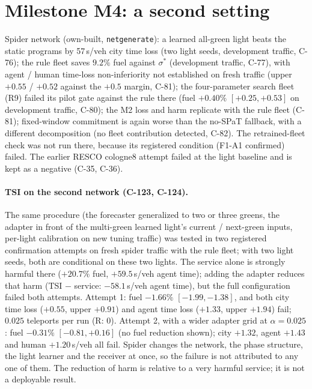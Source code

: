 \documentclass[11pt]{article}
\begin{document}
\section{Milestone M4: a second setting}
Spider network (own-built, \texttt{netgenerate}): a learned all-green light beats the static programs by 57\,s/veh city time loss (two light seeds, development
traffic, C-76); the rule fleet saves $9.2\%$ fuel against $\sigma^*$ (development traffic, C-77), with agent / human time-loss non-inferiority not established on fresh traffic
(upper $+0.55$ / $+0.52$ against the $+0.5$ margin, C-81);
the four-parameter search fleet (R9) failed its pilot gate against the rule there (fuel $+0.40\%$ $[+0.25,+0.53]$ on development
traffic, C-80); the M2 loss and harm replicate with the rule fleet (C-81); fixed-window commitment is again worse than the
no-SPaT fallback, with a different decomposition (no fleet contribution detected, C-82). The retrained-fleet check was not run there, because its registered condition (F1-A1 confirmed) failed. The
earlier RESCO cologne8 attempt failed at the light baseline and is kept as a negative (C-35, C-36).
\paragraph{TSI on the second network (C-123, C-124).} The same procedure (the forecaster generalized to two or three greens, the adapter
in front of the multi-green learned light's current / next-green inputs, per-light calibration on new tuning traffic) was tested in two registered
confirmation attempts on fresh spider traffic with the rule fleet; with two light seeds, both are conditional on these two lights. The service alone is strongly harmful there ($+20.7\%$ fuel, $+59.5$\,s/veh agent time); adding
the adapter reduces that harm (TSI $-$ service: $-58.1$\,s/veh agent time), but the full configuration failed both attempts. Attempt 1: fuel $-1.66\%$
$[-1.99,-1.38]$, and both city time loss ($+0.55$, upper $+0.91$) and agent time loss ($+1.33$, upper $+1.94$) fail; $0.025$ teleports per
run (R: 0). Attempt 2, with a wider adapter grid at $\alpha=0.025$: fuel $-0.31\%$ $[-0.81,+0.16]$ (no fuel reduction shown); city $+1.32$,
agent $+1.43$ and human $+1.20$\,s/veh all fail. Spider changes the network, the phase structure, the light learner and the receiver at
once, so the failure is not attributed to any one of them. The reduction of harm is relative to a very harmful service; it is not a
deployable result.
\end{document}

